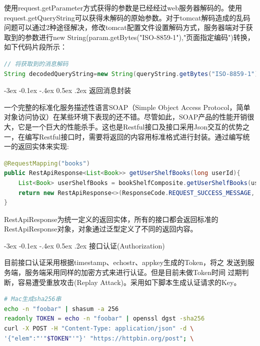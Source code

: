 \documentclass[11pt,fleqn]{book}
\makeatletter
\numberwithin{dummy}{section}
\theoremstyle{ocrenumbox}
\theoremstyle{blacknumex}
\theoremstyle{blacknumbox}
\theoremstyle{ocrenum}
\renewcommand{\subsection}{\@startsection {subsection}{2}{\z@}
	{-3ex \@plus -0.1ex \@minus -.4ex}
	{0.5ex \@plus.2ex }
	{\normalfont\sffamily\bfseries}}
\newlength\esp
\makeatother
\begin{document}
使用request.getParameter方式获得的参数是已经经过web服务器解码的。使用request.getQueryString可以获得未解码的原始参数。对于tomcat解码造成的乱码问题可以通过2种途径解决，修改tomcat配置文件设置解码方式，服务器端对于获取到的参数进行new String(param.getBytes("ISO-8859-1"),"页面指定编码")转换，如下代码片段所示：

\begin{lstlisting}[language=Java]
// 将获取到的消息解码
String decodedQueryString=new String(queryString.getBytes("ISO-8859-1"),"UTF-8");
\end{lstlisting}


\subsection{返回消息封装}

一个完整的标准化服务描述性语言SOAP（Simple Object Access Protocol，简单对象访问协议）在某些环境下表现的还不错。尽管如此，SOAP产品的性能开销很大，它是一个巨大的性能杀手。这也是Restful接口及接口采用Json交互的优势之一，在编写Restful接口时，需要将返回的内容用标准格式进行封装。通过编写统一的返回实体来实现:

\begin{lstlisting}[language=Java]
@RequestMapping("books")
public RestApiResponse<List<Book>> getUserShelfBooks(long userId){
	List<Book> userShelfBooks = bookShelfComposite.getUserShelfBooks(userId);
	return new RestApiResponse<>(ResponseCode.REQUEST_SUCCESS_MESSAGE, ResponseCode.REQUEST_SUCCESS, userShelfBooks);
}
\end{lstlisting}

RestApiResponse为统一定义的返回实体，所有的接口都会返回标准的RestApiResponse对象，对象通过泛型定义了不同的返回内容。

\subsection{接口认证(Authorization)}

目前接口认证采用根据timestamp、echostr、appkey生成的Token，将之
发送到服务端，服务端采用同样的加密方式来进行认证。但是目前未做Token时间
过期判断，容易遭受重放攻击(Replay Attack)。采用如下脚本生成认证请求的Key。

\begin{lstlisting}[language=Bash]
# Mac生成sha256串
echo -n "foobar" | shasum -a 256
readonly TOKEN = echo -n "foobar" | openssl dgst -sha256
curl -X POST -H "Content-Type: application/json" -d \
'{"elem":"'"$TOKEN"'"}' "https://httpbin.org/post"; \
\end{lstlisting}
\end{document}
